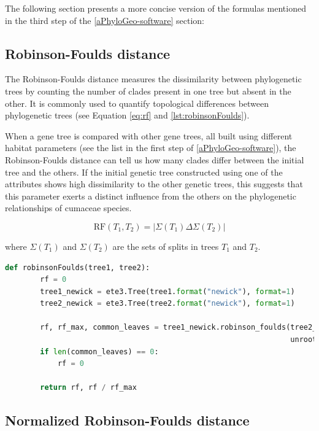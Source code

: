 The following section presents a more concise version of the formulas mentioned in the third step of the \autoref{aPhyloGeo-software} section:

\subsection{Robinson-Foulds distance}\label{RF}

The Robinson-Foulds distance measures the dissimilarity between phylogenetic trees by counting the number of clades present in one tree but absent in the other. It is commonly used to quantify topological differences between phylogenetic trees (see Equation \eqref{eq:rf} and \autoref{lst:robinsonFoulds}).

When a gene tree is compared with other gene trees, all built using different habitat parameters (see the list in the first step of \autoref{aPhyloGeo-software}), the Robinson-Foulds distance can tell us how many clades differ between the initial tree and the others. If the initial genetic tree constructed using one of the attributes shows high dissimilarity to the other genetic trees, this suggests that this parameter exerts a distinct influence from the others on the phylogenetic relationships of cumaceae species.

\begin{equation}\label{eq:rf}
    \text{RF}(T_1, T_2) = | \Sigma(T_1) \Delta \Sigma(T_2) |
\end{equation}

where $\Sigma(T_1)$ and $\Sigma(T_2)$ are the sets of splits in trees $T_1$ and $T_2$.

\begin{lstlisting}[label=lst:robinsonFoulds,language=Python,caption=Python script for calculating the Robinson-Foulds distance using the ete3 package in the aPhyloGeo package.]
    def robinsonFoulds(tree1, tree2):
        rf = 0
        tree1_newick = ete3.Tree(tree1.format("newick"), format=1)
        tree2_newick = ete3.Tree(tree2.format("newick"), format=1)

        rf, rf_max, common_leaves = tree1_newick.robinson_foulds(tree2_newick, 
                                                                 unrooted_trees=True)
        if len(common_leaves) == 0:
            rf = 0

        return rf, rf / rf_max
\end{lstlisting}


\subsection{Normalized Robinson-Foulds distance}\label{RFnorm}

